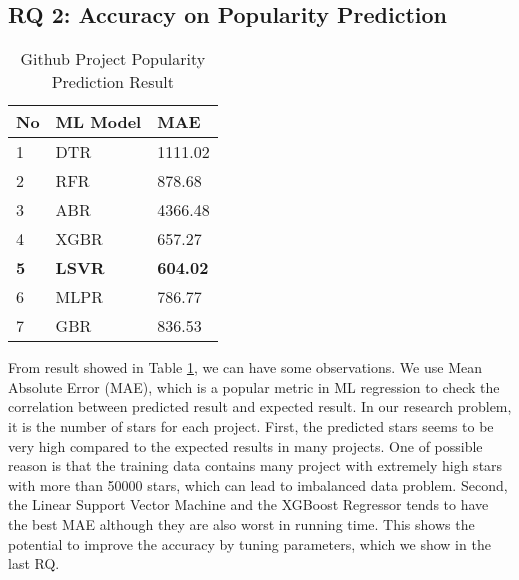 \subsection{RQ 2: Accuracy on Popularity Prediction}

\begin{table}[]
\begin{tabular}{|l|l|l|}
\hline
{\color[HTML]{000000} \textbf{No}} & {\color[HTML]{000000} \textbf{ML Model}} & {\color[HTML]{000000} \textbf{MAE}}    \\ \hline
{\color[HTML]{000000} 1}           & {\color[HTML]{000000} DTR}               & {\color[HTML]{000000} 1111.02}         \\ \hline
{\color[HTML]{000000} 2}           & {\color[HTML]{000000} RFR}               & {\color[HTML]{000000} 878.68}          \\ \hline
{\color[HTML]{000000} 3}           & {\color[HTML]{000000} ABR}               & {\color[HTML]{000000} 4366.48}         \\ \hline
{\color[HTML]{000000} 4}           & {\color[HTML]{000000} XGBR}              & {\color[HTML]{000000} 657.27}          \\ \hline
{\color[HTML]{000000} \textbf{5}}  & {\color[HTML]{000000} \textbf{LSVR}}     & {\color[HTML]{000000} \textbf{604.02}} \\ \hline
{\color[HTML]{000000} 6}           & {\color[HTML]{000000} MLPR}              & {\color[HTML]{000000} 786.77}          \\ \hline
{\color[HTML]{000000} 7}           & {\color[HTML]{000000} GBR}               & {\color[HTML]{000000} 836.53}          \\ \hline
\end{tabular}
\label{tblRQ2}
\caption{Github Project Popularity Prediction Result}

\end{table}

From result showed in Table \ref{tblRQ2}, we can have some observations. We use Mean Absolute Error (MAE), which is a popular metric in ML regression to check the correlation between predicted result and expected result. In our research problem, it is the number of stars for each project. First, the predicted stars seems to be very high compared to the expected results in many projects. One of possible reason is that the training data contains many project with extremely high stars with more than 50000 stars, which can lead to imbalanced data problem. Second, the Linear Support Vector Machine and the XGBoost Regressor tends to have the best MAE although they are also worst in running time. This shows the potential to improve the accuracy by tuning parameters, which we show in the last RQ.

